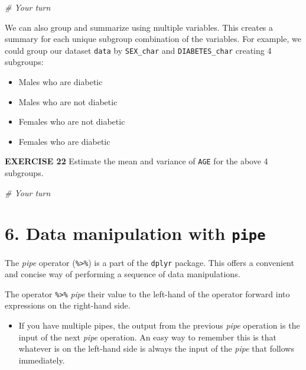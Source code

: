\documentclass[
]{article}
\newenvironment{Shaded}{\begin{snugshade}}{\end{snugshade}}
\newcommand{\CommentTok}[1]{\textcolor[rgb]{0.56,0.35,0.01}{\textit{#1}}}
\providecommand{\tightlist}{%
  \setlength{\itemsep}{0pt}\setlength{\parskip}{0pt}}
\begin{document}
\begin{Shaded}
\begin{Highlighting}[]
\CommentTok{# Your turn}
\end{Highlighting}
\end{Shaded}

We can also group and summarize using multiple variables. This creates a
summary for each unique subgroup combination of the variables. For
example, we could group our dataset \texttt{data} by \texttt{SEX\_char}
and \texttt{DIABETES\_char} creating 4 subgroups:

\begin{itemize}
\tightlist
\item
  Males who are diabetic
\item
  Males who are not diabetic
\item
  Females who are not diabetic
\item
  Females who are diabetic
\end{itemize}

\textbf{EXERCISE 22} Estimate the mean and variance of \texttt{AGE} for
the above 4 subgroups.

\begin{Shaded}
\begin{Highlighting}[]
\CommentTok{# Your turn}
\end{Highlighting}
\end{Shaded}

\hypertarget{data-manipulation-with-pipe}{%
\section{\texorpdfstring{6. Data manipulation with
\texttt{pipe}}{6. Data manipulation with pipe}}\label{data-manipulation-with-pipe}}

The \emph{pipe} operator (\texttt{\%\textgreater{}\%}) is a part of the
\texttt{dplyr} package. This offers a convenient and concise way of
performing a sequence of data manipulations.

The operator \texttt{\%\textgreater{}\%} \emph{pipe} their value to the
left-hand of the operator forward into expressions on the right-hand
side.

\begin{itemize}
\tightlist
\item
  If you have multiple pipes, the output from the previous \emph{pipe}
  operation is the input of the next \emph{pipe} operation. An easy way
  to remember this is that whatever is on the left-hand side is always
  the input of the \emph{pipe} that follows immediately.
\end{itemize}
\end{document}
